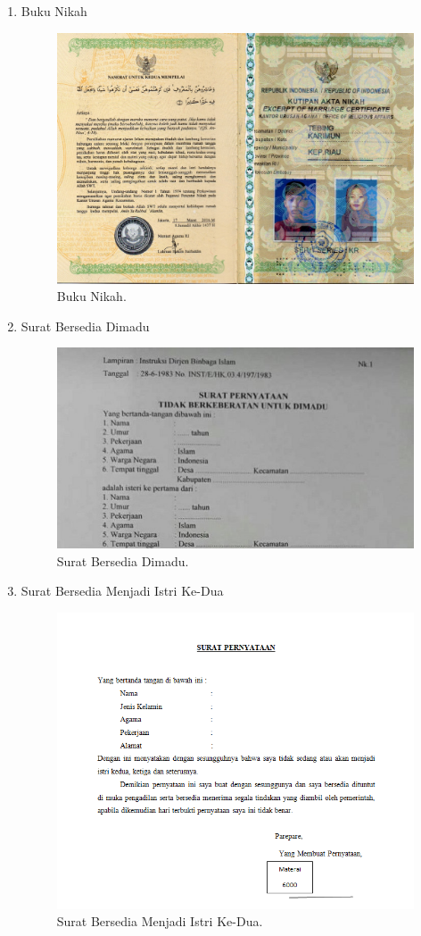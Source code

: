 \begin{enumerate}
	\item Buku Nikah
	\begin{figure}[H]
		\centering
		\includegraphics[width=12cm]{figures/bukunikah.jpg}
		\caption{Buku Nikah.}	
	\end{figure}
	
		\item Surat Bersedia Dimadu
	\begin{figure}[H]
		\centering
		\includegraphics[width=12cm]{figures/surat3.jpg}
		\caption{Surat Bersedia Dimadu.}	
	\end{figure}
	
		\item Surat Bersedia Menjadi Istri Ke-Dua
	\begin{figure}[H]
		\centering
		\includegraphics[width=12cm]{figures/surat4.png}
		\caption{Surat Bersedia Menjadi Istri Ke-Dua.}	
	\end{figure}
\end{enumerate}